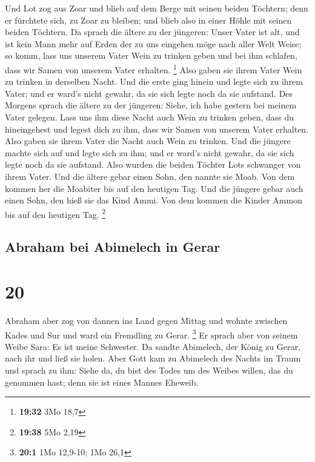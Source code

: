  Und Lot zog aus Zoar und blieb auf dem Berge mit seinen
beiden Töchtern; denn er fürchtete sich, zu Zoar zu bleiben; und blieb
also in einer Höhle mit seinen beiden Töchtern.  Da
sprach die ältere zu der jüngeren: Unser Vater ist alt, und ist kein
Mann mehr auf Erden der zu uns eingehen möge nach aller Welt Weise;
 so komm, lass uns unserem Vater Wein zu trinken geben
und bei ihm schlafen, dass wir Samen von unserem Vater erhalten.
\footnote{\textbf{19:32} 3Mo 18,7}  Also gaben sie ihrem
Vater Wein zu trinken in derselben Nacht. Und die erste ging hinein und
legte sich zu ihrem Vater; und er ward's nicht gewahr, da sie sich legte
noch da sie aufstand.  Des Morgens sprach die ältere zu
der jüngeren: Siehe, ich habe gestern bei meinem Vater gelegen. Lass uns
ihm diese Nacht auch Wein zu trinken geben, dass du hineingehest und
legest dich zu ihm, dass wir Samen von unserem Vater erhalten.
 Also gaben sie ihrem Vater die Nacht auch Wein zu
trinken. Und die jüngere machte sich auf und legte sich zu ihm; und er
ward's nicht gewahr, da sie sich legte noch da sie aufstand.
 Also wurden die beiden Töchter Lots schwanger von ihrem
Vater.  Und die ältere gebar einen Sohn, den nannte sie
Moab. Von dem kommen her die Moabiter bis auf den heutigen Tag.
 Und die jüngere gebar auch einen Sohn, den hieß sie das
Kind Ammi. Von dem kommen die Kinder Ammon bis auf den heutigen Tag.
\footnote{\textbf{19:38} 5Mo 2,19}

\hypertarget{abraham-bei-abimelech-in-gerar}{%
\subsection{Abraham bei Abimelech in
Gerar}\label{abraham-bei-abimelech-in-gerar}}

\hypertarget{section-19}{%
\section{20}\label{section-19}}

 Abraham aber zog von dannen ins Land gegen Mittag und
wohnte zwischen Kades und Sur und ward ein Fremdling zu Gerar.
\footnote{\textbf{20:1} 1Mo 12,9-10; 1Mo 26,1}  Er sprach
aber von seinem Weibe Sara: Es ist meine Schwester. Da sandte Abimelech,
der König zu Gerar, nach ihr und ließ sie holen.  Aber
Gott kam zu Abimelech des Nachts im Traum und sprach zu ihm: Siehe da,
du bist des Todes um des Weibes willen, das du genommen hast; denn sie
ist eines Mannes Eheweib.

